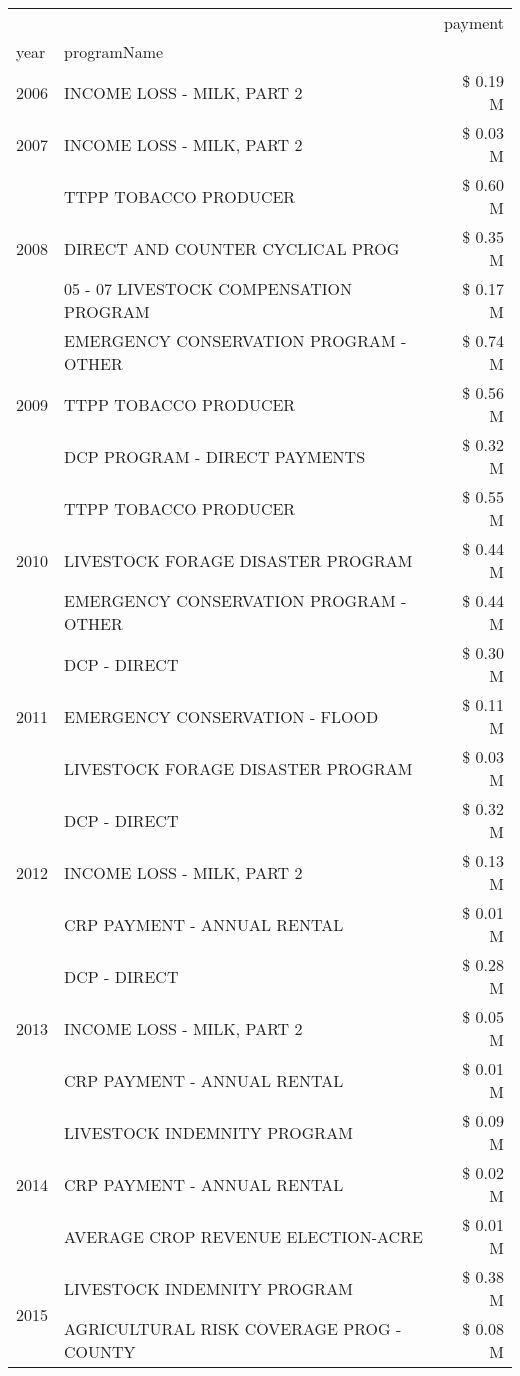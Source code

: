 \begin{tabular}{llr}
\toprule
 &  & payment \\
year & programName &  \\
\midrule
2006 & INCOME LOSS - MILK, PART 2 & \$ 0.19 M \\
\cline{1-3}
2007 & INCOME LOSS - MILK, PART 2 & \$ 0.03 M \\
\cline{1-3}
\multirow[t]{3}{*}{2008} & TTPP TOBACCO PRODUCER & \$ 0.60 M \\
 & DIRECT AND COUNTER CYCLICAL PROG & \$ 0.35 M \\
 & 05 - 07 LIVESTOCK COMPENSATION PROGRAM & \$ 0.17 M \\
\cline{1-3}
\multirow[t]{3}{*}{2009} & EMERGENCY CONSERVATION PROGRAM - OTHER & \$ 0.74 M \\
 & TTPP TOBACCO PRODUCER & \$ 0.56 M \\
 & DCP PROGRAM - DIRECT PAYMENTS & \$ 0.32 M \\
\cline{1-3}
\multirow[t]{3}{*}{2010} & TTPP TOBACCO PRODUCER & \$ 0.55 M \\
 & LIVESTOCK FORAGE DISASTER  PROGRAM & \$ 0.44 M \\
 & EMERGENCY CONSERVATION PROGRAM - OTHER & \$ 0.44 M \\
\cline{1-3}
\multirow[t]{3}{*}{2011} & DCP - DIRECT & \$ 0.30 M \\
 & EMERGENCY CONSERVATION - FLOOD & \$ 0.11 M \\
 & LIVESTOCK FORAGE DISASTER PROGRAM & \$ 0.03 M \\
\cline{1-3}
\multirow[t]{3}{*}{2012} & DCP - DIRECT & \$ 0.32 M \\
 & INCOME LOSS - MILK, PART 2 & \$ 0.13 M \\
 & CRP PAYMENT - ANNUAL RENTAL & \$ 0.01 M \\
\cline{1-3}
\multirow[t]{3}{*}{2013} & DCP - DIRECT & \$ 0.28 M \\
 & INCOME LOSS - MILK, PART 2 & \$ 0.05 M \\
 & CRP PAYMENT - ANNUAL RENTAL & \$ 0.01 M \\
\cline{1-3}
\multirow[t]{3}{*}{2014} & LIVESTOCK INDEMNITY PROGRAM & \$ 0.09 M \\
 & CRP PAYMENT - ANNUAL RENTAL & \$ 0.02 M \\
 & AVERAGE CROP REVENUE ELECTION-ACRE & \$ 0.01 M \\
\cline{1-3}
\multirow[t]{3}{*}{2015} & LIVESTOCK INDEMNITY PROGRAM & \$ 0.38 M \\
 & AGRICULTURAL RISK COVERAGE PROG - COUNTY & \$ 0.08 M \\

\end{tabular}
